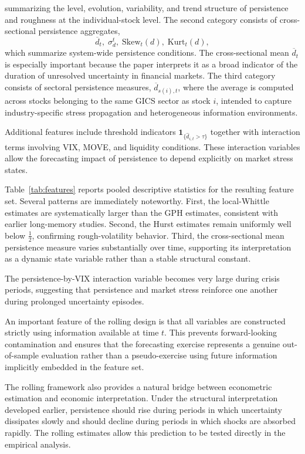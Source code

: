 \documentclass[unnumsec,webpdf,contemporary,large]{oup-authoring-template}%
\theoremstyle{thmstyleone}%
\theoremstyle{thmstyletwo}%
\theoremstyle{thmstylethree}%
\begin{document}
summarizing the level, evolution, variability, and trend structure of
persistence and roughness at the individual-stock level. The second
category consists of cross-sectional persistence aggregates,
\begin{equation}
  \overline{d}_t,\;\sigma_d^t,\;\mathrm{Skew}_t(d),\;\mathrm{Kurt}_t(d),
\end{equation}
which summarize system-wide persistence conditions. The cross-sectional
mean $\overline d_t$ is especially important because the paper interprets
it as a broad indicator of the duration of unresolved uncertainty in
financial markets. The third category consists of sectoral persistence
measures, $\overline d_{s(i),t}$, where the average is computed across
stocks belonging to the same GICS sector as stock $i$, intended to capture
industry-specific stress propagation and heterogeneous information environments.


Additional features include threshold indicators $\mathbf 1_{\{ \hat{d}_{i,t}
> \tau\}}$ together with interaction terms involving VIX, MOVE, and
liquidity conditions. These interaction variables allow the forecasting
impact of persistence to depend explicitly on market stress states.

Table~\ref{tab:features} reports pooled descriptive statistics for the
resulting feature set. Several patterns are immediately noteworthy. First,
the local-Whittle estimates are systematically larger than the GPH
estimates, consistent with earlier long-memory studies. Second, the Hurst
estimates remain uniformly well below $\frac{1}{2}$, confirming rough-volatility
behavior. Third, the cross-sectional mean persistence measure varies
substantially over time, supporting its interpretation as a dynamic state
variable rather than a stable structural constant.


The persistence-by-VIX interaction variable becomes very large during crisis periods, suggesting
that persistence and market stress reinforce one another during prolonged uncertainty episodes.

An important feature of the rolling design is that all variables are constructed strictly using information available at time $t$. This prevents
forward-looking contamination and ensures that the forecasting exercise
represents a genuine out-of-sample evaluation rather than a pseudo-exercise
using future information implicitly embedded in the feature set.

The rolling framework also provides a natural bridge between econometric
estimation and economic interpretation. Under the structural interpretation
developed earlier, persistence should rise during periods in which
uncertainty dissipates slowly and should decline during periods in which
shocks are absorbed rapidly. The rolling estimates allow this prediction to
be tested directly in the empirical analysis.
\end{document}
